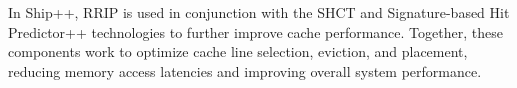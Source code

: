 In Ship++, RRIP is used in conjunction with the SHCT and Signature-based Hit Predictor++ technologies to further improve cache performance. Together, these components work to optimize cache line selection, eviction, and placement, reducing memory access latencies and improving overall system performance.\cite{C2010}
